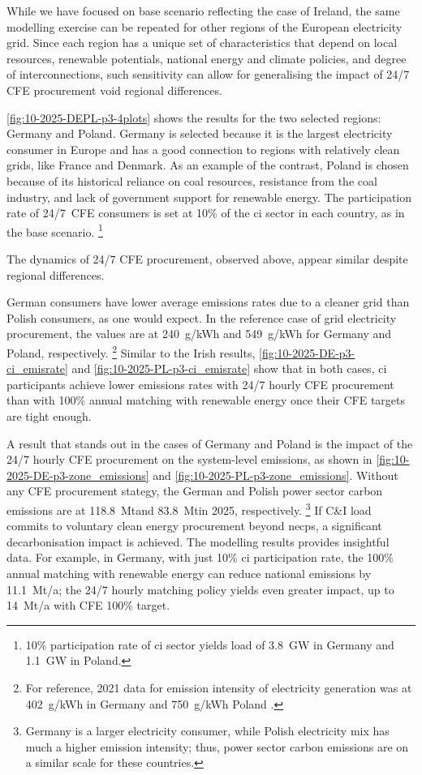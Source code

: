 While we have focused on base scenario reflecting the case of Ireland, the same modelling exercise can be repeated for other regions of the European electricity grid.
Since each region has a unique set of characteristics that depend on local resources, renewable potentials, national energy and climate policies, and degree of interconnections, such sensitivity can allow for generalising the impact of 24/7 CFE procurement void regional differences.

\cref{fig:10-2025-DEPL-p3-4plots} shows the results for the two selected regions: Germany and Poland. 
Germany is selected because it is the largest electricity consumer in Europe and has a good connection to regions with relatively clean grids, like France and Denmark. 
As an example of the contrast, Poland is chosen because of its historical reliance on coal resources, resistance from the coal industry, and lack of government support for renewable energy.
The participation rate of 24/7~CFE consumers is set at 10\% of the \gls{ci} sector in each country, as in the base scenario.%
\footnote{10\% participation rate of \gls{ci} sector yields load of 3.8~GW in Germany and 1.1~GW in Poland.}

The dynamics of 24/7 CFE procurement, observed above, appear similar despite regional differences.

German consumers have lower average emissions rates due to a cleaner grid than Polish consumers, as one would expect.
In the reference case of grid electricity procurement, the values are at 240~g\co/kWh and 549~g\co/kWh for Germany and Poland, respectively.%
\footnote{For reference, 2021 data for emission intensity of electricity generation was at 402~g\co/kWh in Germany and 750~g\co/kWh Poland \cite{EEA-europa-web}.}
Similar to the Irish results, \cref{fig:10-2025-DE-p3-ci_emisrate} and \cref{fig:10-2025-PL-p3-ci_emisrate} show that in both cases, \gls{ci} participants achieve lower emissions rates with 24/7 hourly CFE procurement than with 100\% annual matching with renewable energy once their CFE targets are tight enough. 

A result that stands out in the cases of Germany and Poland is the impact of the 24/7 hourly CFE procurement on the system-level \co emissions, as shown in \cref{fig:10-2025-DE-p3-zone_emissions} and \cref{fig:10-2025-PL-p3-zone_emissions}.
Without any CFE procurement stategy, the German and Polish power sector carbon emissions are at 118.8~Mt\co and 83.8~Mt\co in 2025, respectively.%
\footnote{Germany is a larger electricity consumer, while Polish electricity mix has much a higher emission intensity; thus, power sector carbon emissions are on a similar scale for these countries.} 
If C\&I load commits to voluntary clean energy procurement beyond \gls{necp}s, a significant decarbonisation impact is achieved. 
The modelling results provides insightful data.
For example, in Germany, with just 10\% \gls{ci} participation rate, the 100\% annual matching with renewable energy can reduce national emissions by 11.1~Mt\co/a; the 24/7 hourly matching policy yields even greater impact, up to 14~Mt\co/a with CFE 100\% target.

